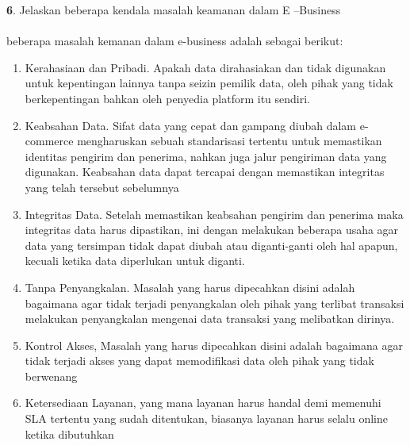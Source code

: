 \documentclass{article}
\begin{document}
\noindent\textbf{6}. Jelaskan beberapa kendala masalah keamanan dalam E –Business
\\\\beberapa masalah kemanan dalam e-business adalah sebagai berikut:
\begin{enumerate}
    \item Kerahasiaan dan Pribadi. Apakah data dirahasiakan dan tidak digunakan untuk kepentingan lainnya tanpa seizin pemilik data, oleh pihak yang tidak berkepentingan bahkan oleh penyedia platform itu sendiri.  
    \item Keabsahan Data. Sifat data yang cepat dan gampang diubah dalam e-commerce mengharuskan sebuah standarisasi tertentu untuk memastikan identitas pengirim dan penerima, nahkan juga jalur pengiriman data yang digunakan. Keabsahan data dapat tercapai dengan memastikan integritas yang telah tersebut sebelumnya
    \item Integritas Data. Setelah memastikan keabsahan pengirim dan penerima maka integritas data harus dipastikan, ini dengan melakukan beberapa usaha agar data yang tersimpan tidak dapat diubah atau diganti-ganti oleh hal apapun, kecuali ketika data diperlukan untuk diganti.
    \item Tanpa Penyangkalan. Masalah yang harus dipecahkan disini adalah bagaimana agar tidak terjadi penyangkalan oleh pihak yang terlibat transaksi melakukan penyangkalan mengenai data transaksi yang melibatkan dirinya.
    \item Kontrol Akses, Masalah yang harus dipecahkan disini adalah bagaimana agar tidak terjadi akses yang dapat memodifikasi data oleh pihak yang tidak berwenang
    \item Ketersediaan Layanan, yang mana layanan harus handal demi memenuhi SLA tertentu yang sudah ditentukan, biasanya layanan harus selalu online ketika dibutuhkan
\end{enumerate}
\end{document}
